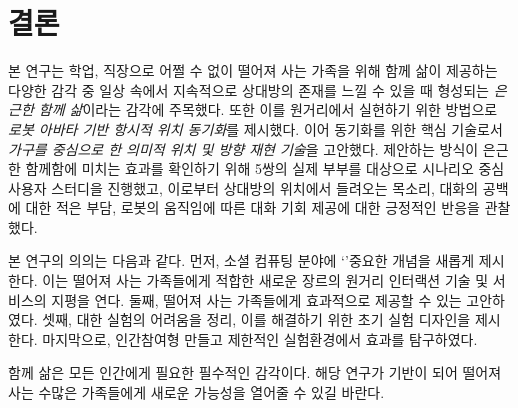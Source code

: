 \chapter{결론}
\label{sec:conclusion}

본 연구는 학업, 직장으로 어쩔 수 없이 떨어져 사는 가족을 위해 함께 삶이 제공하는 다양한 감각 중 일상 속에서 지속적으로 상대방의 존재를 느낄 수 있을 때 형성되는 \emph{은근한 함께 삶}이라는 감각에 주목했다. 또한 이를 원거리에서 실현하기 위한 방법으로 \emph{로봇 아바타 기반 항시적 위치 동기화}를 제시했다. 이어 동기화를 위한 핵심 기술로서 \emph{가구를 중심으로 한 의미적 위치 및 방향 재현 기술}을 고안했다. 제안하는 방식이 은근한 함께함에 미치는 효과를 확인하기 위해 5쌍의 실제 부부를 대상으로 시나리오 중심 사용자 스터디을 진행했고, 이로부터 상대방의 위치에서 들려오는 목소리, 대화의 공백에 대한 적은 부담, 로봇의 움직임에 따른 대화 기회 제공에 대한 긍정적인 반응을 관찰했다.

본 연구의 의의는 다음과 같다.
먼저, 소셜 컴퓨팅 분야에 `\concept' 중요한 개념을 새롭게 제시한다. 이는 떨어져 사는 가족들에게 적합한 새로운 장르의 원거리 인터랙션 기술 및 서비스의 지평을 연다.
둘째, 떨어져 사는 가족들에게 \concept\을 효과적으로 제공할 수 있는 \approach\을 고안하였다.
셋째,  대한 실험의 어려움을 정리, 이를 해결하기 위한 초기 실험 디자인을 제시한다.
마지막으로, 인간참여형 \sysname\를 만들고 제한적인 실험환경에서  효과를 탐구하였다.

함께 삶은 모든 인간에게 필요한 필수적인 감각이다. 해당 연구가 기반이 되어 떨어져 사는 수많은 가족들에게 새로운 가능성을 열어줄 수 있길 바란다.
